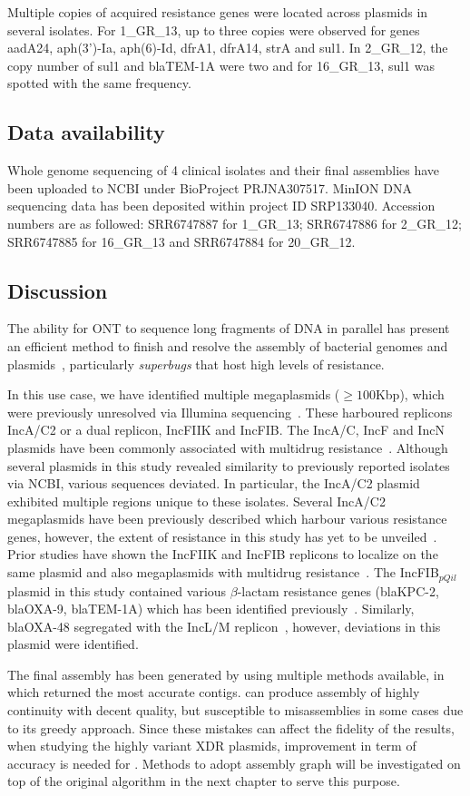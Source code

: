 Multiple copies of acquired resistance genes were located across plasmids in several isolates. For 1\_GR\_13, up to three copies were observed for genes aadA24, aph(3')-Ia, aph(6)-Id, dfrA1, dfrA14, strA and sul1. In 2\_GR\_12, the copy number of sul1 and blaTEM-1A were two and for 16\_GR\_13, sul1 was spotted with the same frequency.

\subsection{Data availability}
Whole genome sequencing of 4 clinical isolates and their final assemblies have been uploaded to NCBI under BioProject PRJNA307517.
MinION DNA sequencing data has been deposited within project ID SRP133040. 
Accession numbers are as followed: SRR6747887 for 1\_GR\_13; SRR6747886 for 2\_GR\_12; SRR6747885 for 16\_GR\_13 and SRR6747884 for 20\_GR\_12.

\subsection{Discussion}
The ability for ONT to sequence long fragments of DNA in parallel has present an efficient method to finish  and resolve the assembly of bacterial genomes and plasmids~\cite{Cao2017scaffolding,Wick2017M12}, particularly \emph{superbugs} that host high levels of resistance. 

In this use case, we have identified multiple megaplasmids ($\geq 100$Kbp), which were previously unresolved via Illumina sequencing~\cite{Miranda2018}. These harboured replicons IncA/C2 or a dual replicon, IncFIIK and IncFIB. 
The IncA/C, IncF and IncN plasmids have been commonly associated with multidrug resistance~\cite{Carattoli2009M34}. 
Although several plasmids in this study revealed similarity to previously reported isolates via NCBI, various sequences deviated. 
In particular, the IncA/C2 plasmid exhibited multiple regions unique to these isolates. 
Several IncA/C2 megaplasmids have been previously described which harbour various resistance genes, however, the extent of resistance in this study has yet to be unveiled~\cite{Desmet2018M35,Papagiannitsis2016cM36}. 
Prior studies have shown the IncFIIK and IncFIB replicons to localize on the same plasmid and also megaplasmids with multidrug resistance~\cite{Navon2017M6}. 
The IncFIB$_{pQil}$ plasmid in this study contained various $\beta$-lactam resistance genes (blaKPC-2, blaOXA-9, blaTEM-1A) which has been identified previously~\cite{Chen2014M37}. Similarly, blaOXA-48 segregated with the IncL/M replicon~\cite{Poirel2012M38,Potron2014M39}, however, deviations in this plasmid were identified.

The final assembly has been generated by using multiple methods available, in which \unicycler{} returned the most accurate contigs. \npscarf{} can produce assembly of highly continuity with decent quality, but susceptible to misassemblies in some cases due to its greedy approach. Since  these mistakes can affect the fidelity of the results, \EG{} when studying the highly variant XDR plasmids, improvement in term of accuracy is needed for \npscarf{}. Methods to adopt assembly graph will be investigated on top of the original algorithm in the next chapter to serve this purpose. 
